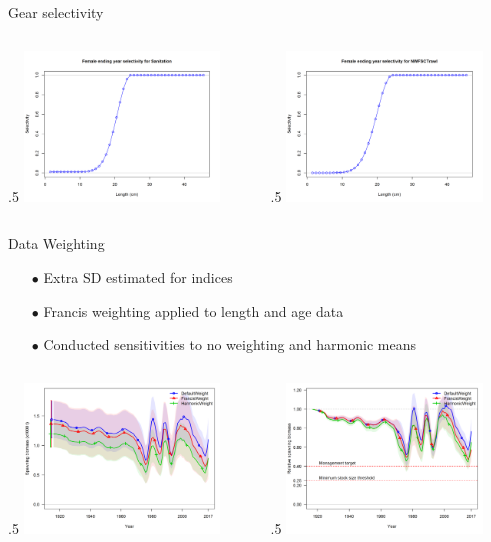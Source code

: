 \documentclass[ignorenonframetext,]{beamer}
\def\begincols{\begin{columns}}
\def\begincol{\begin{column}}
\def\endcol{\end{column}}
\def\endcols{\end{columns}}
\begin{document}
\begin{frame}{Gear selectivity}

\begincols
 \begincol{.5\textwidth}
\includegraphics[height=4cm]{r4ss/plots_mod1/sel09_len_flt7sex1.png}

\endcol
 \begincol{.5\textwidth}
\includegraphics[height=4cm]{r4ss/plots_mod1/sel09_len_flt8sex1.png}
\endcol
\endcols

\end{frame}

\begin{frame}{Data Weighting}

\begin{itemize}
\item[$\bullet$] Extra SD estimated for indices
\item[$\bullet$] Francis weighting applied to length and age data
\item[$\bullet$] Conducted sensitivities to no weighting and harmonic means
\end{itemize}

\begincols
 \begincol{.5\textwidth}
\includegraphics[height=4cm]{Figures/Data_weighting_spawnb.png} \endcol
 \begincol{.5\textwidth}
\includegraphics[height=4cm]{Figures/Data_weighting_Bratio.png} \endcol
\endcols

\end{frame}
\end{document}
